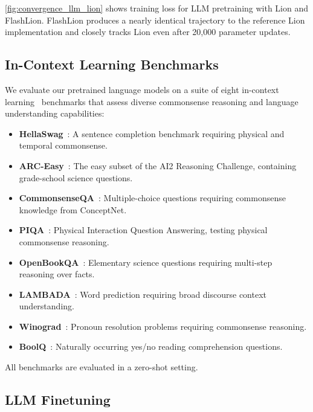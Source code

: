 \documentclass[10pt,twocolumn,letterpaper]{article}
\theoremstyle{plain}
\theoremstyle{definition}
\theoremstyle{remark}
\newcommand{\flashLion}{FlashLion\xspace}
\begin{document}
\autoref{fig:convergence_llm_lion} shows training loss for LLM pretraining with Lion and \flashLion. \flashLion produces a nearly identical trajectory to the reference Lion implementation and closely tracks Lion even after 20,000 parameter updates.

\subsection{In-Context Learning Benchmarks}
\label{sec:appendix_icl}

We evaluate our pretrained language models on a suite of eight in-context learning~\citep{brown2020language} benchmarks that assess diverse commonsense reasoning and language understanding capabilities:

\begin{itemize}[noitemsep]
    \item \textbf{HellaSwag}~\citep{zellers2019hellaswag}: A sentence completion benchmark requiring physical and temporal commonsense.
    \item \textbf{ARC-Easy}~\citep{clark2018arc}: The easy subset of the AI2 Reasoning Challenge, containing grade-school science questions.
    \item \textbf{CommonsenseQA}~\citep{talmor2019commonsenseqa}: Multiple-choice questions requiring commonsense knowledge from ConceptNet.
    \item \textbf{PIQA}~\citep{bisk2020piqa}: Physical Interaction Question Answering, testing physical commonsense reasoning.
    \item \textbf{OpenBookQA}~\citep{mihaylov2018openbookqa}: Elementary science questions requiring multi-step reasoning over facts.
    \item \textbf{LAMBADA}~\citep{paperno2016lambada}: Word prediction requiring broad discourse context understanding.
    \item \textbf{Winograd}~\citep{levesque2012winograd}: Pronoun resolution problems requiring commonsense reasoning.
    \item \textbf{BoolQ}~\citep{clark2019boolq}: Naturally occurring yes/no reading comprehension questions.
\end{itemize}

All benchmarks are evaluated in a zero-shot setting.

\subsection{LLM Finetuning}
\label{sec:appendix_finetuning}
\end{document}
